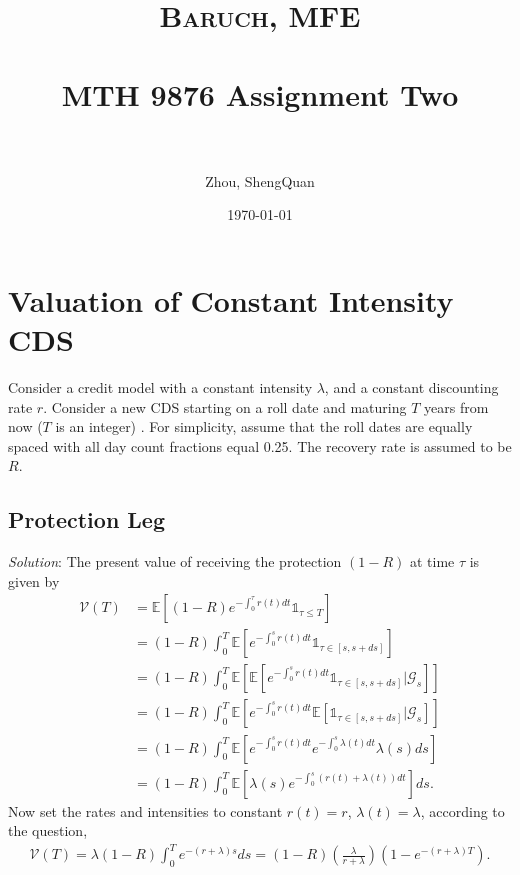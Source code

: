 \documentclass[paper=a4, fontsize=11pt]{scrartcl} %
\title{	
\normalfont \normalsize 
\textsc{Baruch, MFE} \\ [25pt] %
\horrule{0.5pt} \\[0.4cm] %
\huge MTH 9876 Assignment Two\\  %
\horrule{2pt} \\[0.5cm] %
}
\author{Zhou, ShengQuan} %
\date{\normalsize\today} %
\numberwithin{equation}{section} %
\numberwithin{figure}{section} %
\numberwithin{table}{section} %
\begin{document}
	


\maketitle %

\newpage



\section{Valuation of Constant Intensity CDS}
Consider a credit model with a constant intensity $\lambda$, and a constant discounting rate $r$. 
Consider a new CDS starting on a roll date and maturing $T$ years
from now ($T$ is an integer) . For simplicity, assume that the roll dates are
equally spaced with all day count fractions equal 0.25. The recovery rate is
assumed to be $R$.\\

\subsection{Protection Leg}
\textit{Solution}: The present value of receiving the protection $(1-R)$ at time $\tau$ is given by
\begin{align}
\nonumber \mathcal{V}(T) & = \mathbb{E}\left[ (1-R) e^{-\int_0^\tau r(t)dt} \mathbb{1}_{\tau\le T}\right]\\
\nonumber &= (1-R)\int_0^T  \mathbb{E}\left[ e^{-\int_0^s r(t)dt} \mathbb{1}_{\tau\in [s,s+ds]}\right]  \\
\nonumber &= (1-R)\int_0^T  \mathbb{E}\left[ \mathbb{E}\left[ e^{-\int_0^s r(t)dt} \mathbb{1}_{\tau\in [s,s+ds]}
\Big| \mathcal{G}_s \right]\right]  \\
\nonumber &= (1-R)\int_0^T  \mathbb{E}\left[ e^{-\int_0^s r(t)dt} \mathbb{E}\left[  \mathbb{1}_{\tau\in [s,s+ds]}
\Big| \mathcal{G}_s \right]\right]  \\
\nonumber &= (1-R)\int_0^T  \mathbb{E}\left[ e^{-\int_0^s r(t)dt} e^{-\int_0^s \lambda(t)dt}\lambda(s)ds \right]  \\
\nonumber &= (1-R)\int_0^T  \mathbb{E}\left[ \lambda(s)e^{-\int_0^s \left(r(t)+\lambda(t)\right)dt}\right] ds.
\end{align}
Now set the rates and intensities to constant $r(t)=r$, $\lambda(t)=\lambda$, according to the question,
\begin{align}
\nonumber \mathcal{V}(T) = \lambda (1-R)\int_0^T e^{-(r+\lambda)s}ds = (1-R) \left(\frac{\lambda}{r+\lambda}\right) \left(1-e^{-(r+\lambda)T}\right).
\end{align}
\end{document}
